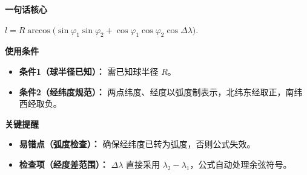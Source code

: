 \begin{summarybox}
	\textbf{\textcolor{CSummary}{一句话核心}}

	\medskip
	\textbf{$l = R\arccos\bigl(\sin\varphi_1\sin\varphi_2 + \cos\varphi_1\cos\varphi_2\cos\Delta\lambda\bigr)$}.

	\medskip
	\textbf{\textcolor{CSummary}{使用条件}}
	\begin{itemize}[leftmargin=*, itemsep=0.5em, topsep=0.4em]
		\item \textbf{条件1（球半径已知）：} 需已知球半径 $R$。
		\item \textbf{条件2（经纬度规范）：} 两点纬度、经度以弧度制表示，北纬东经取正，南纬西经取负。
	\end{itemize}

	\medskip
	\textbf{\textcolor{CSummary}{关键提醒}}
	\begin{itemize}[leftmargin=*, itemsep=0.5em, topsep=0.4em]
		\item \textbf{易错点（弧度检查）：} 确保经纬度已转为弧度，否则公式失效。
		\item \textbf{检查项（经度差范围）：} $\Delta\lambda$ 直接采用 $\lambda_2-\lambda_1$，公式自动处理余弦符号。
	\end{itemize}

\end{summarybox}

